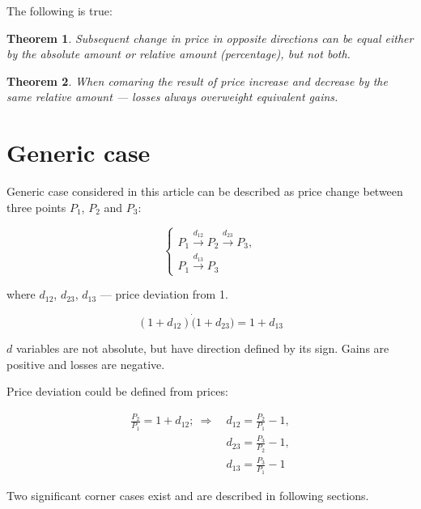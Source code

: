 \documentclass[a4paper]{article}
\newtheorem*{theorem}{Theorem}
\begin{document}
The following is true:

\begin{theorem}
Subsequent change in price in opposite directions
can be equal either by the absolute amount
or relative amount (percentage), but not both.
\end{theorem}

\begin{theorem}
When comaring the result of price increase and decrease by the same relative
amount --- losses always overweight equivalent gains.
\end{theorem}

\section*{Generic case}

Generic case considered in this article can be described as price change
between three points $P_1$, $P_2$ and $P_3$:

\begin{equation}
  \begin{cases}
    P_1 \xrightarrow{d_{12}} P_2 \xrightarrow{d_{23}} P_3,\\
    P_1 \xrightarrow{d_{13}} P_3
  \end{cases}
\end{equation}

where $d_{12}$, $d_{23}$, $d_{13}$ --- price deviation from 1.

\begin{equation}
  (1 + d_{12}) \dot (1 + d_{23}) = 1 + d_{13}
\end{equation}

$d$ variables are not absolute, but have direction defined by its sign.
Gains are positive and losses are negative.

Price deviation could be defined from prices:

\begin{subequations}
\begin{align}
  \frac{P_2}{P_1} = 1 + d_{12}; \ \Rightarrow \ &d_{12} = \frac{P_2}{P_1} - 1,\\
                                                &d_{23} = \frac{P_3}{P_2} - 1,\\
                                                &d_{13} = \frac{P_3}{P_1} - 1
\end{align}
\label{eq:p1_p2_p3}
\end{subequations}

Two significant corner cases exist and are described in following sections.
\end{document}
